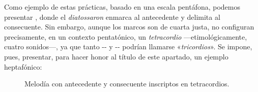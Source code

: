 \documentclass[a4paper,12pt]{article}
\begin{document}
\begin{multicols}{2}
  Como ejemplo de estas prácticas, basado en una escala pentáfona, podemos presentar
  \hbox{,}\label{ej:tetra-penta} donde el \emph{diatossaron}  enmarca al antecedente y  delimita al consecuente. Sin embargo, aunque los marcos son de cuarta justa, no configuran precisamente, en un contexto pentatónico, un \emph{tetracordio} ---etimológicamente, cuatro sonidos---, ya que tanto -- y -- podrían llamarse «\emph{tricordios}». Se impone, pues, presentar, para hacer honor al título de este apartado, un ejemplo heptafónico:
  \end{multicols}

  \begin{figure}[ht]
\centering
{}
\caption{Melodía con antecedente y consecuente inscriptos en tetracordios.}\label{fig:tetra-hepta}
\end{figure}
\end{document}
